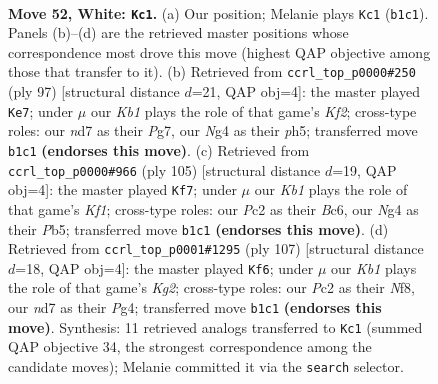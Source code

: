 \documentclass[11pt]{article}
\begin{document}
\clearpage

\begin{figure}[p]\centering
\begin{subfigure}{0.46\textwidth}\centering
\resizebox{\linewidth}{!}{%
\newchessgame
\chessboard[
  setfen={k7/1b1n4/8/8/p2p2N1/P5P1/1PP5/1K6 w - - 22 52},
  showmover=false,
  pgfstyle=straightmove, color=movearrow, markmove={b1-c1}
]}
\caption{}
\end{subfigure}\hfill
\begin{subfigure}{0.46\textwidth}\centering
\resizebox{\linewidth}{!}{%
\newchessgame
\chessboard[
  setfen={8/5kp1/1p5p/3K3P/PbB5/4P3/5P2/8 b - - 4 49},
  showmover=false,
  pgfstyle=straightmove, color=movearrow, markmove={f7-e7}
]}
\caption{}
\end{subfigure}
\\[4pt]
\begin{subfigure}{0.46\textwidth}\centering
\resizebox{\linewidth}{!}{%
\newchessgame
\chessboard[
  setfen={5k2/4p3/2b5/1pP2Pp1/p5P1/P3K3/3B4/8 b - - 25 53},
  showmover=false,
  pgfstyle=straightmove, color=movearrow, markmove={f8-f7}
]}
\caption{}
\end{subfigure}\hfill
\begin{subfigure}{0.46\textwidth}\centering
\resizebox{\linewidth}{!}{%
\newchessgame
\chessboard[
  setfen={5n2/5pk1/2B5/3K3p/6pP/6P1/5P2/8 b - - 6 54},
  showmover=false,
  pgfstyle=straightmove, color=movearrow, markmove={g7-f6}
]}
\caption{}
\end{subfigure}
\caption{\textbf{Move 52, White: \texttt{Kc1}.} (a) Our position; Melanie plays \texttt{Kc1} (\texttt{b1c1}). Panels (b)--(d) are the retrieved master positions whose correspondence most drove this move (highest QAP objective among those that transfer to it). (b) Retrieved from \texttt{ccrl\_top\_p0000\#250} (ply 97) [structural distance $d$=21, QAP obj=4]: the master played \texttt{Ke7}; under $\mu$ our \emph{Kb1} plays the role of that game's \emph{Kf2}; cross-type roles: our \emph{n}d7 as their \emph{P}g7, our \emph{N}g4 as their \emph{p}h5; transferred move \texttt{b1c1} \textbf{(endorses this move)}. (c) Retrieved from \texttt{ccrl\_top\_p0000\#966} (ply 105) [structural distance $d$=19, QAP obj=4]: the master played \texttt{Kf7}; under $\mu$ our \emph{Kb1} plays the role of that game's \emph{Kf1}; cross-type roles: our \emph{P}c2 as their \emph{B}c6, our \emph{N}g4 as their \emph{P}b5; transferred move \texttt{b1c1} \textbf{(endorses this move)}. (d) Retrieved from \texttt{ccrl\_top\_p0001\#1295} (ply 107) [structural distance $d$=18, QAP obj=4]: the master played \texttt{Kf6}; under $\mu$ our \emph{Kb1} plays the role of that game's \emph{Kg2}; cross-type roles: our \emph{P}c2 as their \emph{N}f8, our \emph{n}d7 as their \emph{P}g4; transferred move \texttt{b1c1} \textbf{(endorses this move)}. Synthesis: 11 retrieved analogs transferred to \texttt{Kc1} (summed QAP objective 34, the strongest correspondence among the candidate moves); Melanie committed it via the \texttt{search} selector.}
\label{fig:thought-m102}
\end{figure}
\end{document}

